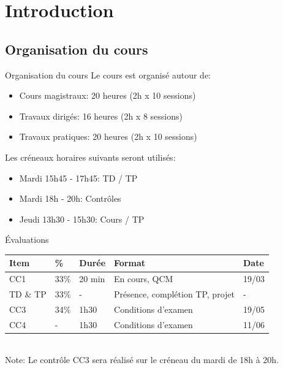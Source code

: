\section[Introduction]{Introduction}

\subsection[Organisation du cours]{Organisation du cours}

\begin{frame}{Organisation du cours}
	Le cours est organisé autour de:
	\begin{itemize}
		\item Cours magistraux: 20 heures (2h x 10 sessions)
		\item Travaux dirigés: 16 heures (2h x 8 sessions)
		\item Travaux pratiques: 20 heures (2h x 10 sessions)
	\end{itemize}
	\vspace{0.5cm}
	Les créneaux horaires suivants seront utilisés:
	\begin{itemize}
		\item Mardi 15h45 - 17h45: TD / TP
		\item Mardi 18h - 20h: Contrôles
		\item Jeudi 13h30 - 15h30: Cours / TP
	\end{itemize}
\end{frame}

\begin{frame}{Évaluations}
	\begin{tabular}{|l|l|l|l|l|}
		\hline
		\textbf{Item} & \textbf{\%} & \textbf{Durée} & \textbf{Format} & \textbf{Date} \\
		\hline
		CC1 & 33\% & 20 min & En cours, QCM & 19/03 \\
		\hline
		TD \& TP & 33\% & - & Présence, complétion TP, projet & - \\
		\hline
		CC3 & 34\% & 1h30 & Conditions d'examen & 19/05 \\
		\hline
		CC4 & - & 1h30 & Conditions d'examen & 11/06 \\
		\hline
	\end{tabular} \\
	\vspace{0.5cm}
	Note: Le contrôle CC3 sera réalisé sur le créneau du mardi de 18h à 20h.
\end{frame}

